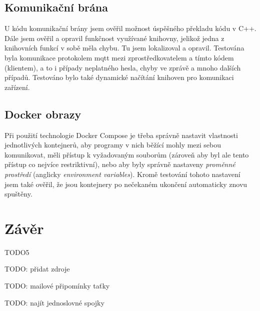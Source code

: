 \section{Komunikační brána}

U kódu komunikační brány jsem ověřil možnost úspěšného překladu kódu v C++. Dále jsem ověřil a opravil funkčnost využívané knihovny, jelikož jedna z knihovních funkcí v sobě měla chybu. Tu jsem lokalizoval a opravil. Testována byla komunikace protokolem \acrshort{mqtt} mezi zprostředkovatelem a tímto kódem (klientem), a to i případy neplatného hesla, chyby ve zprávě a mnoho dalších případů. Testováno bylo také dynamické načítání knihoven pro komunikaci zařízení.

\section{Docker obrazy}

Při použití technologie Docker Compose je třeba správně nastavit vlastnosti jednotlivých kontejnerů, aby programy v nich běžící mohly mezi sebou komunikovat, měli přístup k vyžadovaným souborům (zároveň aby byl ale tento přístup co nejvíce restriktivní), nebo aby byly správně nastaveny \emph{proměnné prostředí} (anglicky \emph{environment variables}). Kromě testování tohoto nastavení jsem také ověřil, že jsou kontejnery po nečekaném ukončení automaticky znovu spuštěny.


\chapter{Závěr}

TODO5

TODO: přidat zdroje

TODO: mailové připomínky taťky

TODO: najít jednoslovné spojky